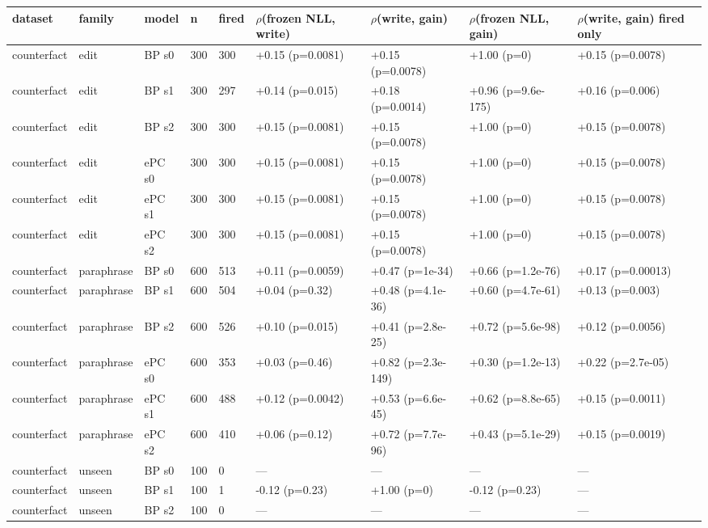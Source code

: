 \documentclass[10pt,a4paper]{article}
\begin{document}
\begin{center}\scriptsize
\begin{tabularx}{\textwidth}{@{}p{}XXXXXXXX@{}}
\toprule
dataset & family & model & n & fired & $\rho$(frozen NLL, write) & $\rho$(write, gain) & $\rho$(frozen NLL, gain) & $\rho$(write, gain) fired only \\ \midrule
counterfact & edit & BP s0 & 300 & 300 & +0.15 (p=0.0081) & +0.15 (p=0.0078) & +1.00 (p=0) & +0.15 (p=0.0078) \\
counterfact & edit & BP s1 & 300 & 297 & +0.14 (p=0.015) & +0.18 (p=0.0014) & +0.96 (p=9.6e-175) & +0.16 (p=0.006) \\
counterfact & edit & BP s2 & 300 & 300 & +0.15 (p=0.0081) & +0.15 (p=0.0078) & +1.00 (p=0) & +0.15 (p=0.0078) \\
counterfact & edit & ePC s0 & 300 & 300 & +0.15 (p=0.0081) & +0.15 (p=0.0078) & +1.00 (p=0) & +0.15 (p=0.0078) \\
counterfact & edit & ePC s1 & 300 & 300 & +0.15 (p=0.0081) & +0.15 (p=0.0078) & +1.00 (p=0) & +0.15 (p=0.0078) \\
counterfact & edit & ePC s2 & 300 & 300 & +0.15 (p=0.0081) & +0.15 (p=0.0078) & +1.00 (p=0) & +0.15 (p=0.0078) \\
counterfact & paraphrase & BP s0 & 600 & 513 & +0.11 (p=0.0059) & +0.47 (p=1e-34) & +0.66 (p=1.2e-76) & +0.17 (p=0.00013) \\
counterfact & paraphrase & BP s1 & 600 & 504 & +0.04 (p=0.32) & +0.48 (p=4.1e-36) & +0.60 (p=4.7e-61) & +0.13 (p=0.003) \\
counterfact & paraphrase & BP s2 & 600 & 526 & +0.10 (p=0.015) & +0.41 (p=2.8e-25) & +0.72 (p=5.6e-98) & +0.12 (p=0.0056) \\
counterfact & paraphrase & ePC s0 & 600 & 353 & +0.03 (p=0.46) & +0.82 (p=2.3e-149) & +0.30 (p=1.2e-13) & +0.22 (p=2.7e-05) \\
counterfact & paraphrase & ePC s1 & 600 & 488 & +0.12 (p=0.0042) & +0.53 (p=6.6e-45) & +0.62 (p=8.8e-65) & +0.15 (p=0.0011) \\
counterfact & paraphrase & ePC s2 & 600 & 410 & +0.06 (p=0.12) & +0.72 (p=7.7e-96) & +0.43 (p=5.1e-29) & +0.15 (p=0.0019) \\
counterfact & unseen & BP s0 & 100 & 0 & — & — & — & — \\
counterfact & unseen & BP s1 & 100 & 1 & -0.12 (p=0.23) & +1.00 (p=0) & -0.12 (p=0.23) & — \\
counterfact & unseen & BP s2 & 100 & 0 & — & — & — & — \\

\end{tabularx}
\end{center}
\end{document}
